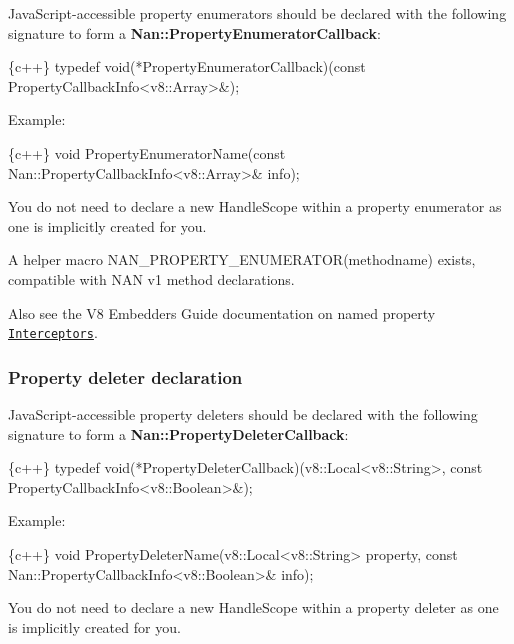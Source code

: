 Java\+Script-\/accessible property enumerators should be declared with the following signature to form a {\bfseries {\ttfamily Nan\+::\+Property\+Enumerator\+Callback}}\+:


\begin{DoxyCode}
\{c++\}
typedef void(*PropertyEnumeratorCallback)(const PropertyCallbackInfo<v8::Array>&);
\end{DoxyCode}


Example\+:


\begin{DoxyCode}
\{c++\}
void PropertyEnumeratorName(const Nan::PropertyCallbackInfo<v8::Array>& info);
\end{DoxyCode}


You do not need to declare a new {\ttfamily Handle\+Scope} within a property enumerator as one is implicitly created for you.

A helper macro {\ttfamily N\+A\+N\+\_\+\+P\+R\+O\+P\+E\+R\+T\+Y\+\_\+\+E\+N\+U\+M\+E\+R\+A\+T\+O\+R(methodname)} exists, compatible with N\+AN v1 method declarations.

Also see the V8 Embedders Guide documentation on named property \href{https://developers.google.com/v8/embed#interceptors}{\tt Interceptors}.

\label{_api_nan_property_deleter}%
 \subsubsection*{Property deleter declaration}

Java\+Script-\/accessible property deleters should be declared with the following signature to form a {\bfseries {\ttfamily Nan\+::\+Property\+Deleter\+Callback}}\+:


\begin{DoxyCode}
\{c++\}
typedef void(*PropertyDeleterCallback)(v8::Local<v8::String>,
                                       const PropertyCallbackInfo<v8::Boolean>&);
\end{DoxyCode}


Example\+:


\begin{DoxyCode}
\{c++\}
void PropertyDeleterName(v8::Local<v8::String> property,
                         const Nan::PropertyCallbackInfo<v8::Boolean>& info);
\end{DoxyCode}


You do not need to declare a new {\ttfamily Handle\+Scope} within a property deleter as one is implicitly created for you.

